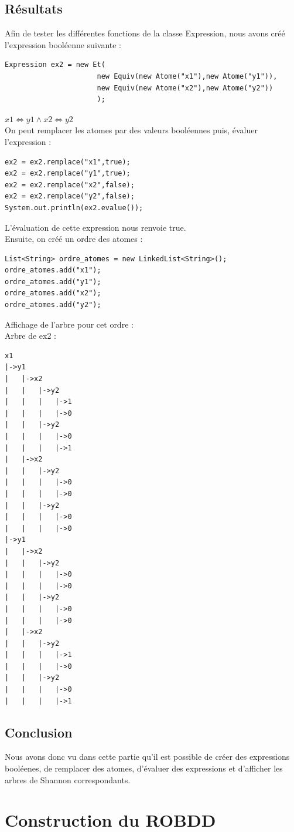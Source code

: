 \documentclass{article}
\begin{document}
\subsection{Résultats}
Afin de tester les différentes fonctions de la classe Expression, nous avons créé l'expression booléenne suivante : \\
\begin{verbatim}
Expression ex2 = new Et(
                      new Equiv(new Atome("x1"),new Atome("y1")), 
                      new Equiv(new Atome("x2"),new Atome("y2"))
                      );
\end{verbatim}
$x1\Longleftrightarrow y1\wedge x2\Longleftrightarrow y2$\\
On peut remplacer les atomes par des valeurs booléennes puis, évaluer l'expression :
\begin{verbatim}
ex2 = ex2.remplace("x1",true);
ex2 = ex2.remplace("y1",true);
ex2 = ex2.remplace("x2",false);
ex2 = ex2.remplace("y2",false);
System.out.println(ex2.evalue());
\end{verbatim}
L'évaluation de cette expression nous renvoie true.\\
Ensuite, on créé un ordre des atomes :
\begin{verbatim}
List<String> ordre_atomes = new LinkedList<String>();
ordre_atomes.add("x1");
ordre_atomes.add("y1");
ordre_atomes.add("x2");
ordre_atomes.add("y2");
\end{verbatim}
Affichage de l'arbre pour cet ordre : \\
Arbre de ex2 : \\
\begin{verbatim}
x1
|->y1
|   |->x2
|   |   |->y2
|   |   |   |->1
|   |   |   |->0
|   |   |->y2
|   |   |   |->0
|   |   |   |->1
|   |->x2
|   |   |->y2
|   |   |   |->0
|   |   |   |->0
|   |   |->y2
|   |   |   |->0
|   |   |   |->0
|->y1
|   |->x2
|   |   |->y2
|   |   |   |->0
|   |   |   |->0
|   |   |->y2
|   |   |   |->0
|   |   |   |->0
|   |->x2
|   |   |->y2
|   |   |   |->1
|   |   |   |->0
|   |   |->y2
|   |   |   |->0
|   |   |   |->1
\end{verbatim}
\subsection{Conclusion}
Nous avons donc vu dans cette partie qu'il est possible de créer des expressions booléenes, de remplacer des atomes, d'évaluer des expressions et d'afficher les arbres de Shannon correspondants. 
\section{Construction du ROBDD}
\end{document}
